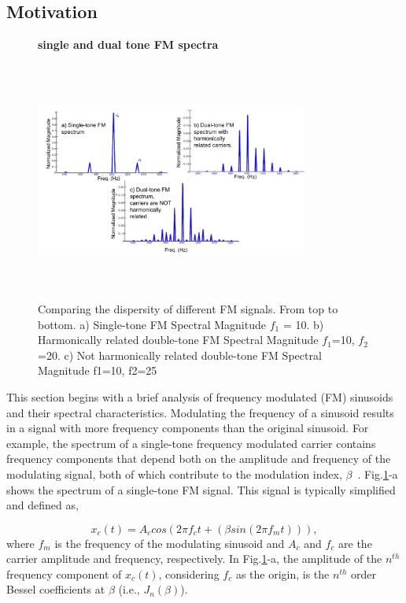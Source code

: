 {\subsection{Motivation}

\begin{figure}[b!]
	\centering
	\hspace{-1mm}
	\textbf{single and dual tone FM spectra}\par\medskip
	\includegraphics[height = 3.1in, width=0.8\textwidth]{figures/tone_FM_spectra}
	\vspace{-1mm}
	\caption{ Comparing the dispersity of different FM signals.
		From top to bottom. 
		a) Single-tone FM Spectral Magnitude $f_1$ = 10. 
		b) Harmonically related double-tone FM Spectral Magnitude $f_1$=10, $f_2$=20. 
		c) Not harmonically related double-tone FM Spectral Magnitude f1=10, f2=25}
	\vspace{0mm}
	\label{fig:ch2_tone_fm_spectra}
\end{figure}

This section begins with a brief analysis of frequency modulated (FM) sinusoids and their spectral characteristics. 
Modulating the frequency of a sinusoid results in a signal with more frequency components than the original sinusoid. 
For example, the spectrum of a single-tone frequency modulated carrier contains frequency components that depend both on the amplitude and frequency of the modulating signal, both of which contribute to the modulation index, $\beta$~\cite{carlson2010communication}. 
Fig.\ref{fig:ch2_tone_fm_spectra}-a shows the spectrum of a single-tone FM signal. 
This signal is typically simplified and defined as, 

\begin{equation}
\label{eq:1sin_fm}
x_c(t) = A_ccos(2\pi f_ct+(\beta sin(2\pi f_mt))),
\end{equation}
where $f_m$ is the frequency of the modulating sinusoid and $A_c$ and $f_c$ are the carrier amplitude and frequency, respectively. 
In Fig.\ref{fig:ch2_tone_fm_spectra}-a, the amplitude of the $n^{th}$ frequency component of $x_c(t)$, considering $f_c$ as the origin, is the $n^{th}$ order Bessel coefficients at $\beta$ (i.e., $J_n(\beta)$). 

}
